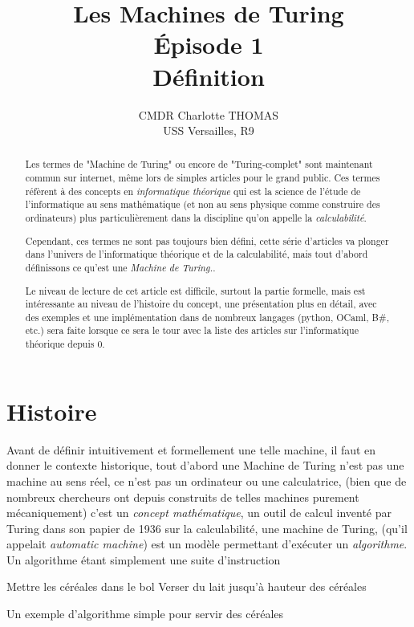 \documentclass[colorlinks]{article}
\title{Les Machines de Turing \\ Épisode 1 \\ Définition}
\author{CMDR Charlotte THOMAS \\ USS Versailles, R9}
\begin{document}
    \maketitle
    \begin{abstract}
        Les termes de "Machine de Turing" ou encore de "Turing-complet" sont maintenant commun sur internet, même lors de 
        simples articles pour le grand public. Ces termes réfèrent à des concepts en \textit{informatique théorique} qui 
        est la science de l'étude de l'informatique au sens mathématique (et non au sens physique comme construire des ordinateurs)
        plus particulièrement dans la discipline qu'on appelle la \textit{calculabilité}.\newline

        Cependant, ces termes ne sont pas toujours bien défini, cette série d'articles va plonger dans l'univers de l'informatique 
        théorique et de la calculabilité, mais tout d'abord définissons ce qu'est une \textit{Machine de Turing.}.\newline


        Le niveau de lecture de cet article est difficile, surtout la partie formelle, mais est intéressante au niveau de 
        l'histoire du concept, une présentation plus en détail, avec des exemples et une implémentation dans de nombreux langages 
        (python, OCaml, B\#, etc.) sera faite lorsque ce sera le tour avec la liste des articles sur l'informatique théorique depuis 0.
    \end{abstract}
    \tableofcontents
    \cleardoublepage
    \section{Histoire}
    Avant de définir intuitivement et formellement une telle machine, il faut en donner le contexte historique,
    tout d'abord une Machine de Turing n'est pas une machine au sens réel, ce n'est pas un ordinateur ou une calculatrice, 
    (bien que de nombreux chercheurs ont depuis construits de telles machines purement mécaniquement) c'est un \textit{concept mathématique},
    un outil de calcul inventé par Turing dans son papier de 1936 sur la calculabilité, une machine de Turing, (qu'il appelait \textit{automatic machine}) 
    est un modèle permettant d'exécuter un \textit{algorithme}. Un algorithme étant simplement une suite d'instruction
    
    \vspace{1em}
    \begin{algorithm}[H]
        \SetAlgoLined
        \nl Mettre les céréales dans le bol\;
        \nl Verser du lait jusqu'à hauteur des céréales\;
        \caption{Un exemple d'algorithme simple pour servir des céréales}
    \end{algorithm}
    \vspace{1em}
    
\end{document}
